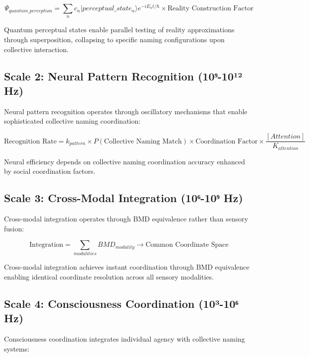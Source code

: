 \documentclass[12pt,a4paper]{article}
\begin{document}
\begin{equation}
\Psi_{quantum\_perception} = \sum_n c_n |perceptual\_state_n\rangle e^{-iE_n t/\hbar} \times \text{Reality Construction Factor}
\end{equation}

Quantum perceptual states enable parallel testing of reality approximations through superposition, collapsing to specific naming configurations upon collective interaction.

\subsection{Scale 2: Neural Pattern Recognition (10⁹-10¹² Hz)}

Neural pattern recognition operates through oscillatory mechanisms that enable sophisticated collective naming coordination:

\begin{equation}
\text{Recognition Rate} = k_{pattern} \times P(\text{Collective Naming Match}) \times \text{Coordination Factor} \times \frac{[Attention]}{K_{attention}}
\end{equation}

Neural efficiency depends on collective naming coordination accuracy enhanced by social coordination factors.

\subsection{Scale 3: Cross-Modal Integration (10⁶-10⁹ Hz)}

Cross-modal integration operates through BMD equivalence rather than sensory fusion:

\begin{equation}
\text{Integration} = \sum_{modalities} BMD_{modality} \rightarrow \text{Common Coordinate Space}
\end{equation}

Cross-modal integration achieves instant coordination through BMD equivalence enabling identical coordinate resolution across all sensory modalities.

\subsection{Scale 4: Consciousness Coordination (10³-10⁶ Hz)}

Consciousness coordination integrates individual agency with collective naming systems:
\end{document}
